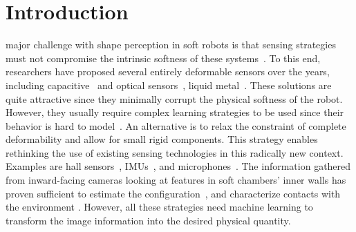 \section{Introduction}\label{sec:srslam:introduction}
%
 major challenge with shape perception in soft robots is that sensing strategies must not compromise the intrinsic softness of these systems~\citep{polygerinos2017soft,wang2018toward}. %
%
To this end, researchers have proposed several entirely deformable sensors over the years, including capacitive~\citep{scimeca2019model} and optical sensors~\citep{li2021scaling}, liquid metal~\citep{wall2017method}. These solutions are quite attractive since they minimally corrupt the physical softness of the robot. However, they usually require complex learning strategies to be used since their behavior is hard to model~\citep{thuruthel2019soft,truby2020distributed}.
%
% 
An alternative is to relax the constraint of complete deformability and allow for small rigid components. This strategy enables rethinking the use of existing sensing technologies in this radically new context. Examples are hall sensors~\citep{guo2019continuum}, \glspl{IMU}~\citep{hughes2020sensing}, and microphones~\citep{zoller2018acoustic}.
%
The information gathered from inward-facing cameras looking at features in soft chambers' inner walls has proven sufficient to estimate the configuration~\citep{she2020exoskeleton,werner2020vision}, and characterize contacts with the environment \citep{ward2018tactip,lin2020curvature}. However, all these strategies need machine learning to transform the image information into the desired physical quantity.
%
